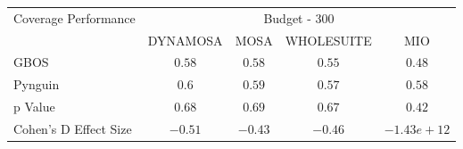 \begin{tabular}{lcccc}\toprule 
\multirow{2}{*}{Coverage Performance} & \multicolumn{4}{c}{Budget - 300} \\ \cmidrule(lr){2-5}  
                                      & DYNAMOSA&MOSA&WHOLESUITE&MIO                         \\ \midrule 
GBOS                                  & \(0.58\)&\(0.58\)&\(0.55\)&\(0.48\)                       \\ 
Pynguin                               & \(0.6\)&\(0.59\)&\(0.57\)&\(0.58\)                       \\ 
p Value                               & \(0.68\)&\(0.69\)&\(0.67\)&\(0.42\)                     \\ 
Cohen's D Effect Size                 & \(-0.51\)&\(-0.43\)&\(-0.46\)&\(-1.43e+12\)                       \\ 
\bottomrule 
\end{tabular}